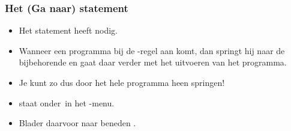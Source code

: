 \begin{frame}
\frametitle{Het  (Ga naar) statement}

\begin{itemize}
  \item<1-> Het  statement heeft  nodig.
  \item<2-> Wanneer een programma bij de -regel aan komt,
  	dan springt hij naar de bijbehorende  en gaat daar verder met het uitvoeren van het programma.
  \item<3-> Je kunt zo dus door het hele programma heen springen!
  \item<4->  staat onder \tiPRGM\,in het -menu.
  \item<5-> Blader daarvoor naar beneden \tiDown.
\end{itemize}



\end{frame}





